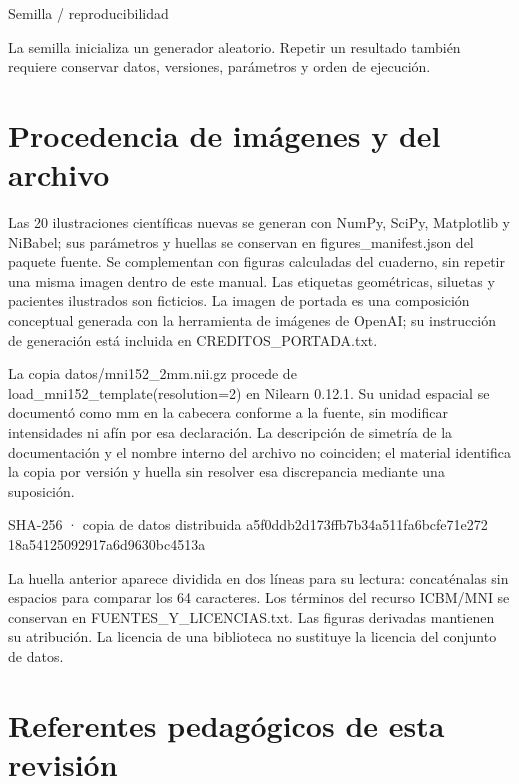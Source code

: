 
\begin{Idea}{Semilla / reproducibilidad}

La semilla inicializa un generador aleatorio. Repetir un resultado también requiere conservar datos, versiones, parámetros y orden de ejecución.


\end{Idea}

\section{Procedencia de imágenes y del archivo}

Las 20 ilustraciones científicas nuevas se generan con NumPy, SciPy, Matplotlib y NiBabel; sus parámetros y huellas se conservan en figures\_manifest.json del paquete fuente. Se complementan con figuras calculadas del cuaderno, sin repetir una misma imagen dentro de este manual. Las etiquetas geométricas, siluetas y pacientes ilustrados son ficticios. La imagen de portada es una composición conceptual generada con la herramienta de imágenes de OpenAI; su instrucción de generación está incluida en CREDITOS\_PORTADA.txt.


La copia datos/mni152\_2mm.nii.gz procede de load\_mni152\_template(resolution=2) en Nilearn 0.12.1. Su unidad espacial se documentó como mm en la cabecera conforme a la fuente, sin modificar intensidades ni afín por esa declaración. La descripción de simetría de la documentación y el nombre interno del archivo no coinciden; el material identifica la copia por versión y huella sin resolver esa discrepancia mediante una suposición.


\begin{Salida}{SHA-256 · copia de datos distribuida}
a5f0ddb2d173ffb7b34a511fa6bcfe71e272
18a54125092917a6d9630bc4513a
\end{Salida}

La huella anterior aparece dividida en dos líneas para su lectura: concaténalas sin espacios para comparar los 64 caracteres. Los términos del recurso ICBM/MNI se conservan en FUENTES\_Y\_LICENCIAS.txt. Las figuras derivadas mantienen su atribución. La licencia de una biblioteca no sustituye la licencia del conjunto de datos.


\section{Referentes pedagógicos de esta revisión}

